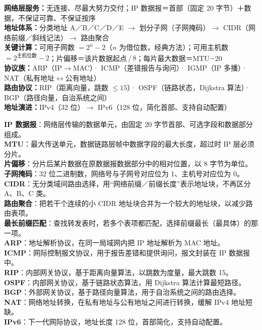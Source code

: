 \documentclass[a4paper,11pt]{article}
\begin{document}

\begin{knowmap}
\textbf{网络层服务：}无连接、尽最大努力交付；IP 数据报＝首部（固定 20 字节）＋数据，不保证可靠、不保证按序\\[2pt]
\textbf{地址体系：}分类地址 A／B／C／D／E $\rightarrow$ 划分子网（子网掩码）$\rightarrow$ CIDR（网络前缀／斜线记法）$\rightarrow$ 路由聚合\\[2pt]
\textbf{关键计算：}可用子网数 $=2^{n}-2$（$n$ 为借位数，经典方法）；可用主机数 $=2^{\text{主机位数}}-2$；片偏移＝该片数据起点$\,/\,8$；每片最大数据＝MTU$-$20\\[2pt]
\textbf{协议族：}ARP（IP$\rightarrow$MAC）· ICMP（差错报告与询问）· IGMP（IP 多播）· NAT（私有地址$\leftrightarrow$公有地址）\\[2pt]
\textbf{路由协议：}RIP（距离向量，跳数 $\le 15$）· OSPF（链路状态，Dijkstra 算法）· BGP（路径向量，自治系统之间）\\[2pt]
\textbf{地址演进：}IPv4（32 位）$\rightarrow$ IPv6（128 位，简化首部、支持自动配置）
\end{knowmap}

\begin{keyterms}
\textbf{IP 数据报}：网络层传输的数据单元，由固定 20 字节首部、可选字段和数据部分组成。\\
\textbf{MTU}：最大传送单元，数据链路层帧中数据字段的最大长度，超过时 IP 层必须分片。\\
\textbf{片偏移}：分片后某片数据在原数据报数据部分中的相对位置，以 8 字节为单位。\\
\textbf{子网掩码}：32 位二进制数，网络号与子网号对应位为 1、主机号对应位为 0。\\
\textbf{CIDR}：无分类域间路由选择，用“网络前缀／前缀长度”表示地址块，不再区分 A、B、C 类。\\
\textbf{路由聚合}：把若干个连续的小 CIDR 地址块合并为一个较大的地址块，以减少路由表项。\\
\textbf{最长前缀匹配}：查找转发表时，若多个表项都匹配，选择前缀最长（最具体）的那一项。\\
\textbf{ARP}：地址解析协议，在同一局域网内把 IP 地址解析为 MAC 地址。\\
\textbf{ICMP}：网际控制报文协议，用于报告差错和提供询问，报文封装在 IP 数据报中。\\
\textbf{RIP}：内部网关协议，基于距离向量算法，以跳数为度量，最大跳数 15。\\
\textbf{OSPF}：内部网关协议，基于链路状态算法，用 Dijkstra 算法计算最短路径。\\
\textbf{BGP}：外部网关协议，基于路径向量算法，用于自治系统之间的路由选择。\\
\textbf{NAT}：网络地址转换，在私有地址与公有地址之间进行转换，缓解 IPv4 地址短缺。\\
\textbf{IPv6}：下一代网际协议，地址长度 128 位，首部简化，支持自动配置。
\end{keyterms}
\end{document}
